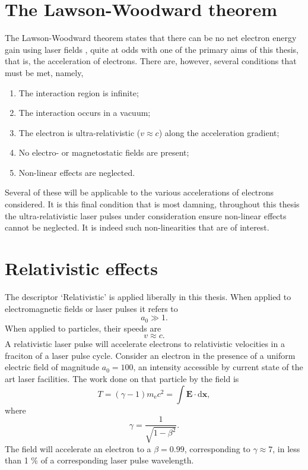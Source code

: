 \section{The Lawson-Woodward theorem}\label{sec:intro-lawson_woodward}
The Lawson-Woodward theorem states that there can be no net electron energy gain using laser fields \cite{esareyPhysicsLaserdrivenPlasmabased2009}, quite at odds with one of the primary aims of this thesis, that is, the acceleration of electrons. There are, however, several conditions that must be met, namely,
\begin{enumerate}
	\item The interaction region is infinite;
	\item The interaction  occurs in a vacuum;
	\item The electron is ultra-relativistic ($v\approx c$) along the acceleration gradient;
	\item No electro- or magnetostatic fields are present;
	\item Non-linear effects are neglected.
\end{enumerate}
Several of these will be applicable to the various accelerations of electrons considered. It is this final condition that is most damning, throughout this thesis the ultra-relativistic laser pulses under consideration ensure non-linear effects cannot be neglected. It is indeed such non-linearities that are of interest.

\section{Relativistic effects}
The descriptor `Relativistic' is applied liberally in this thesis. When applied to electromagnetic fields or laser pulses it refers to 
\begin{equation}
	a_0 \gg 1.
\end{equation}
When applied to particles, their speeds are
\begin{equation}
	v \approx c.
\end{equation}
A relativistic laser pulse will accelerate electrons to relativistic velocities in a fraciton of a laser pulse cycle. Consider an electron in the presence of a uniform electric field of magnitude $a_0 = 100$, an intensity accessible by current state of the art laser facilities. The work done on that particle by the field is 
\begin{equation}
	T = (\gamma -1)m_\mathrm{e}c^2 = \int \mathbf{E}\cdot \mathrm{d} \mathbf{x},
\end{equation}
where 
\begin{equation}
	\gamma = \frac{1}{\sqrt{1-\beta^2}}.
\end{equation}
The field will accelerate an electron to a $\beta = 0.99$, corresponding to $\gamma \approx 7$, in less than 1 \% of a corresponding laser pulse wavelength.

